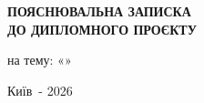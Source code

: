 \documentclass[%
  ukrainian, utf8, columnvii, simple,
  hpadding=10mm, vpadding=10mm, reduceheight=2mm,
  floatsection,
]{eskdtext}
\begin{document}
\thispagestyle{empty}
\vspace*{\fill}
\begin{center}
{\large\textbf{ПОЯСНЮВАЛЬНА ЗАПИСКА\\ДО ДИПЛОМНОГО ПРОЄКТУ}}

\vspace{1.2em}

на тему: «\textit{\thesisTitle}»
\end{center}
\vspace*{\fill}
\begin{center}
Київ~- 2026
\end{center}
\newpage


{%
  \renewcommand{\sectionbreak}{}%
  \singlespacing%
  \tableofcontents%
}










\end{document}
